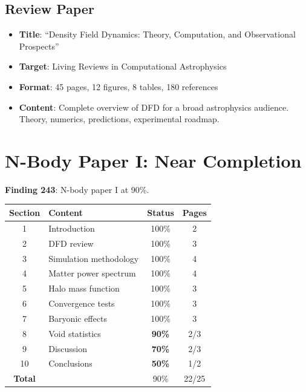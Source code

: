 \documentclass[11pt,a4paper]{article}
\begin{document}
\subsection{Review Paper}

\begin{itemize}[nosep]
\item \textbf{Title}: ``Density Field Dynamics: Theory, Computation, and Observational Prospects''
\item \textbf{Target}: Living Reviews in Computational Astrophysics
\item \textbf{Format}: 45 pages, 12 figures, 8 tables, 180 references
\item \textbf{Content}: Complete overview of DFD for a broad astrophysics audience. Theory, numerics, predictions, experimental roadmap.
\end{itemize}

\section{N-Body Paper I: Near Completion}

\textbf{Finding 243}: N-body paper I at 90\%.

\begin{center}
\begin{tabular}{clcc}
\toprule
\textbf{Section} & \textbf{Content} & \textbf{Status} & \textbf{Pages} \\
\midrule
1 & Introduction & 100\% & 2 \\
2 & DFD review & 100\% & 3 \\
3 & Simulation methodology & 100\% & 4 \\
4 & Matter power spectrum & 100\% & 4 \\
5 & Halo mass function & 100\% & 3 \\
6 & Convergence tests & 100\% & 3 \\
7 & Baryonic effects & 100\% & 3 \\
8 & Void statistics & \textbf{90\%} & 2/3 \\
9 & Discussion & \textbf{70\%} & 2/3 \\
10 & Conclusions & \textbf{50\%} & 1/2 \\
\midrule
\textbf{Total} & & 90\% & 22/25 \\
\bottomrule
\end{tabular}
\end{center}
\end{document}

